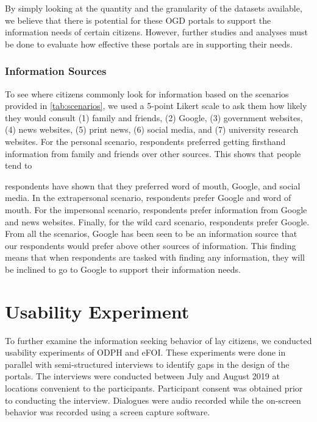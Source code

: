 \documentclass{sigchi}
\begin{document}
By simply looking at the quantity and the granularity of the datasets available, we believe that there is potential for these OGD portals to support the information needs of certain citizens. However, further studies and analyses must be done to evaluate how effective these portals are in supporting their needs. 

\subsubsection{Information Sources}
To see where citizens commonly look for information based on the scenarios provided in \ref{tab:scenarios}, we used a 5-point Likert scale to ask them how likely they would consult (1) family and friends, (2) Google, (3) government websites, (4) news websites, (5) print news, (6) social media, and (7) university research websites. For the personal scenario, respondents preferred getting firsthand information from family and friends over other sources. This shows that people tend to

respondents have shown that they preferred word of mouth, Google, and social media. In the extrapersonal scenario, respondents prefer Google and word of mouth. For the impersonal scenario, respondents prefer information from Google and news websites. Finally, for the wild card scenario, respondents prefer Google. From all the scenarios, Google has been seen to be an information source that our respondents would prefer above other sources of information. This finding means that when respondents are tasked with finding any information, they will be inclined to go to Google to support their information needs.

\section{Usability Experiment}
To further examine the information seeking behavior of lay citizens, we conducted usability experiments of ODPH and eFOI. These experiments were done in parallel with semi-structured interviews to identify gaps in the design of the portals. The interviews were conducted between July and August 2019 at locations convenient to the participants. Participant consent was obtained prior to conducting the interview. Dialogues were audio recorded while the on-screen behavior was recorded using a screen capture software. 
\end{document}

